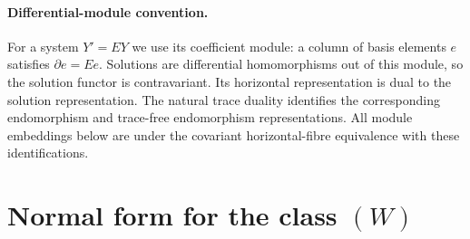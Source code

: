 \documentclass[11pt]{article}
\numberwithin{equation}{section}
\theoremstyle{definition}
\theoremstyle{remark}
\begin{document}
\paragraph{Differential-module convention.}
For a system $Y'=EY$ we use its coefficient module: a column of basis
elements $e$ satisfies $\partial e=Ee$. Solutions are differential
homomorphisms out of this module, so the solution functor is contravariant.
Its horizontal representation is dual to the solution representation.
The natural trace duality identifies the corresponding endomorphism and
trace-free endomorphism representations. All module embeddings below are
under the covariant horizontal-fibre equivalence with these identifications.

\section{Normal form for the class \texorpdfstring{$(W)$}{(W)}}
\end{document}
